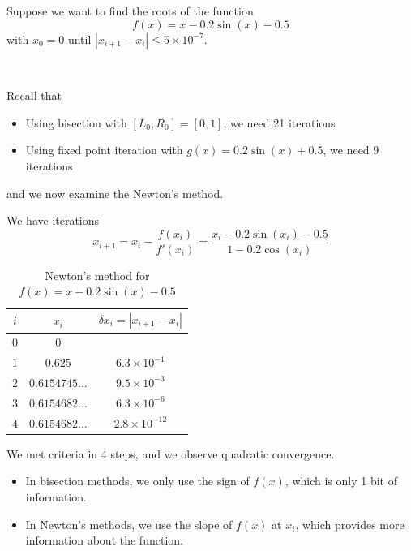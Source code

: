 \begin{example}
    Suppose we want to find the roots of the function \[
        f(x) = x - 0.2\sin(x) - 0.5
    \] with \( x_0 = 0 \) until \( |x_{i+1} - x_i| \leq 5 \times 10^{-7} \).

        {~~~}

    Recall that
    \begin{itemize}
        \item Using bisection with \( [L_0, R_0] = [0, 1] \), we need 21 iterations
        \item Using fixed point iteration with \( g(x) = 0.2 \sin(x) + 0.5 \), we need 9 iterations
    \end{itemize} and we now examine the Newton's method.

    We have iterations \[
        x_{i+1}
        = x_i - \frac{f(x_i)}{f'(x_i)}
        = \frac{x_i - 0.2\sin(x_i) - 0.5}{1 - 0.2\cos(x_i)}
    \]

    \begin{table}[H]
        \centering
        \begin{tabular}{c|c|c}
            \( i \)
             & \( x_i \)
             & \( \delta x_i = | x_{i+1} - x_i | \)
            \\ \hline \hline
            \(0\)
             & \(0\)
             &                                      \\
            \(1\)
             & \(0.625\)
             & \(6.3\times10^{-1}\)                 \\
            \(2\)
             & \(0.6154745\ldots\)
             & \(9.5\times10^{-3}\)                 \\
            \(3\)
             & \(0.6154682\ldots\)
             & \(6.3\times10^{-6}\)                 \\
            \(4\)
             & \(0.6154682\ldots\)
             & \(2.8\times10^{-12}\)                \\
        \end{tabular}
        \caption{Newton's method for \( f(x) = x - 0.2 \sin(x) - 0.5 \)}
    \end{table}

    \begin{note}
        We met criteria in \( 4 \) steps, and we observe quadratic convergence.

        \begin{itemize}
            \item In bisection methods, we only use the sign of \( f(x) \), which is only 1 bit of information.
            \item In Newton's methods, we use the slope of \( f(x) \) at \( x_i \), which provides more information about the function.
        \end{itemize}
    \end{note}
\end{example}

